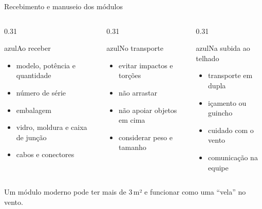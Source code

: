 \documentclass[aspectratio=169,10pt,xcolor=table]{beamer}
\newcommand{\frase}[1]{\vspace{0.1em}\begin{destaque}#1\end{destaque}}
\begin{document}
\begin{frame}{Recebimento e manuseio dos módulos}
  \begin{columns}[T]
    \begin{column}{0.31\textwidth}
      \begin{card}[equal height group=rm]{azul}{\faBoxOpen\enspace Ao receber}
        \begin{itemize}
          \item modelo, potência e quantidade
          \item número de série
          \item embalagem
          \item vidro, moldura e caixa de junção
          \item cabos e conectores
        \end{itemize}
      \end{card}
    \end{column}
    \begin{column}{0.31\textwidth}
      \begin{card}[equal height group=rm]{azul}{\faDolly\enspace No transporte}
        \begin{itemize}
          \item evitar impactos e torções
          \item não arrastar
          \item não apoiar objetos em cima
          \item considerar peso e tamanho
        \end{itemize}
      \end{card}
    \end{column}
    \begin{column}{0.31\textwidth}
      \begin{card}[equal height group=rm]{azul}{\faArrowUp\enspace Na subida ao telhado}
        \begin{itemize}
          \item transporte em dupla
          \item içamento ou guincho
          \item cuidado com o vento
          \item comunicação na equipe
        \end{itemize}
      \end{card}
    \end{column}
  \end{columns}
  \frase{Um módulo moderno pode ter mais de 3\,m² e funcionar como uma ``vela'' no vento.}
\end{frame}
\end{document}

